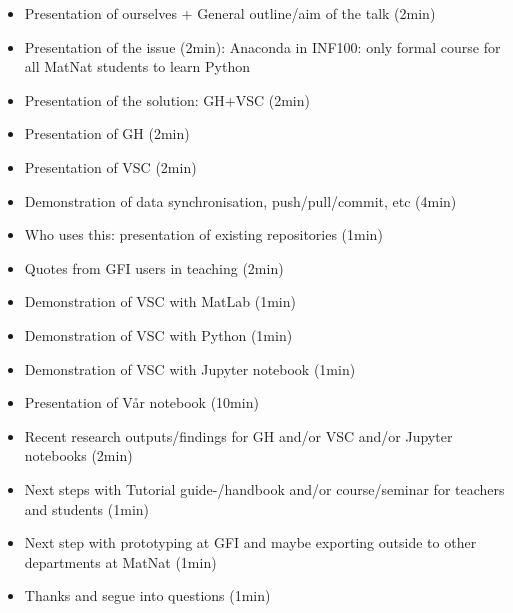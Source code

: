 \documentclass{article}
\begin{document}
\begin{itemize}
    \item Presentation of ourselves + General outline/aim of the talk (2min)
    \item Presentation of the issue (2min): Anaconda in INF100: only formal course for all MatNat students to learn Python
    \item Presentation of the solution: GH+VSC (2min)
    \item Presentation of GH (2min)
    \item Presentation of VSC (2min)
    \item Demonstration of data synchronisation, push/pull/commit, etc (4min)
    \item Who uses this: presentation of existing repositories (1min)
    \item Quotes from GFI users in teaching (2min)
    \item Demonstration of VSC with MatLab (1min)
    \item Demonstration of VSC with Python (1min)
    \item Demonstration of VSC with Jupyter notebook (1min)
    \item Presentation of Vår notebook (10min)
    \item Recent research outputs/findings for GH and/or VSC and/or Jupyter notebooks (2min)
    \item Next steps with Tutorial guide-/handbook and/or course/seminar for teachers and students (1min)
    \item Next step with prototyping at GFI and maybe exporting outside to other departments at MatNat (1min)
    \item Thanks and segue into questions (1min)
\end{itemize}
\end{document}
